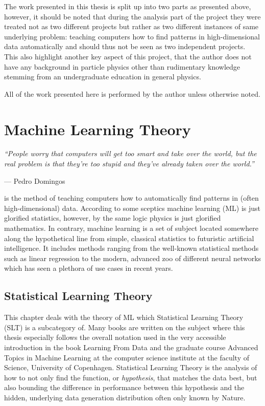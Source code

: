 \documentclass[a4paper, twoside]{tufte-book}
\newcommand{\autocite}[1]{\cite{#1}}
\begin{document}
The work presented in this thesis is split up into two parts as presented above, however, it should be noted that during the analysis part of the project they were treated not as two different projects but rather as two different instances of same underlying problem: teaching computers how to find patterns in high-dimensional data automatically and should thus not be seen as two independent projects. This also highlight another key aspect of this project, that the author does not have any background in particle physics other than rudimentary knowledge stemming from an undergraduate education in general physics. 

All of the work presented here is performed by the author unless otherwise noted.

\chapter{Machine Learning Theory}
\label{ch:ML_theory}

\epigraph{\textit{``People worry that computers will get too smart and take over the world, but the real problem is that they're too stupid and they've already taken over the world.''}}{--- Pedro Domingos}

 is the method of teaching computers how to automatically find patterns in (often high-dimensional) data. According to some sceptics machine learning (ML) is just glorified statistics, however, by the same logic physics is just glorified mathematics. In contrary, machine learning is a set of subject located somewhere along the hypothetical line from simple, classical statistics to futuristic artificial intelligence. It includes methods ranging from the well-known statistical methods such as linear regression to the modern, advanced zoo of different neural networks\autocite{veenNeuralNetworkZoo2016} which has seen a plethora of use cases in recent years. 

\section{Statistical Learning Theory}
This chapter deals with the theory of ML which Statistical Learning Theory (SLT) is a subcategory of. Many books are written on the subject where this thesis especially follows the overall notation used in the very accessible introduction in the book Learning From Data\autocite{abu-mostafaLearningData2012} and the graduate course Advanced Topics in Machine Learning\autocite{AdvancedTopicsMachine} at the computer science institute at the faculty of Science, University of Copenhagen. Statistical Learning Theory is the analysis of how to not only find the function, or \emph{hypothesis}, that matches the data best, but also bounding the difference in performance between this hypothesis and the hidden, underlying data generation distribution often only known by Nature. 
\end{document}
